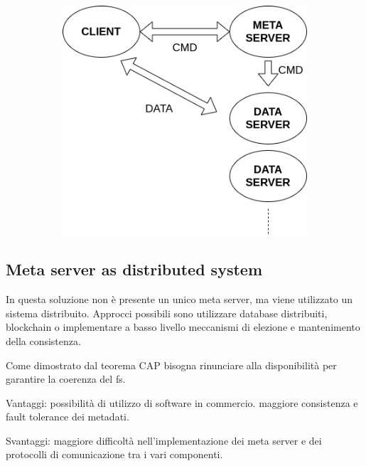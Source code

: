 \documentclass{article}
\begin{document}
\begin{figure}[H]
	\centering
	\begin{subfigure}{0.80\linewidth}
		\includegraphics[width=\linewidth]{../diagrams/architettura/6.png}
	\end{subfigure}
\end{figure}



\subsection{Meta server as distributed system}

In questa soluzione non è presente un unico meta server, ma viene utilizzato un sistema distribuito. 
Approcci possibili sono utilizzare database distribuiti, blockchain o implementare a basso livello meccanismi di elezione e mantenimento della consistenza. 

Come dimostrato dal teorema CAP bisogna rinunciare alla disponibilità per garantire la coerenza del fs. 

Vantaggi: possibilità di utilizzo di software in commercio. maggiore consistenza e fault tolerance dei metadati. 

Svantaggi: maggiore difficoltà nell'implementazione dei meta server e dei protocolli di comunicazione tra i vari componenti. 
\end{document}
